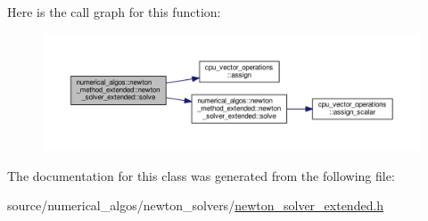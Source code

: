 Here is the call graph for this function\-:\nopagebreak
\begin{figure}[H]
\begin{center}
\leavevmode
\includegraphics[width=350pt]{classnumerical__algos_1_1newton__method__extended_1_1newton__solver__extended_addb6f412050b9e268306890464471d10_cgraph}
\end{center}
\end{figure}




The documentation for this class was generated from the following file\-:\begin{DoxyCompactItemize}
\item 
source/numerical\-\_\-algos/newton\-\_\-solvers/\hyperlink{newton__solver__extended_8h}{newton\-\_\-solver\-\_\-extended.\-h}\end{DoxyCompactItemize}
